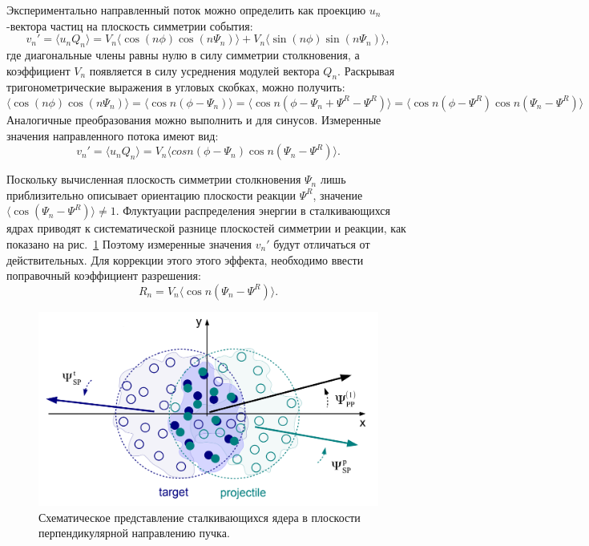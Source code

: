 Экспериментально направленный поток можно определить как проекцию $u_n$-вектора частиц на плоскость симметрии события:
%
\begin{equation}
    v_n' =  \langle u_n Q_n \rangle = 
    V_n \langle \cos (n\phi) \cos (n\Psi_n) \rangle + V_n \langle \sin(n\phi) \sin(n\Psi_n) \rangle,
\end{equation}
%
где диагональные члены равны нулю в силу симметрии столкновения, а коэффициент $V_n$ появляется в силу усреднения модулей вектора $Q_n$.
Раскрывая тригонометрические выражения в угловых скобках, можно получить:
%
\begin{equation}
    \langle \cos (n\phi) \cos (n\Psi_n) \rangle = \langle \cos n ( \phi - \Psi_n ) \rangle = 
    \langle \cos n ( \phi - \Psi_n + \Psi^R - \Psi^R ) \rangle =
    \langle \cos n ( \phi - \Psi^R ) \cos n (\Psi_n - \Psi^R ) \rangle
\end{equation}
%
Аналогичные преобразования можно выполнить и для синусов. 
Измеренные значения направленного потока имеют вид:
%
\begin{equation}
    v_n' =  \langle u_n Q_n \rangle = 
    V_n \langle cos n ( \phi - \Psi_n ) \cos n (\Psi_n - \Psi^R) \rangle.
    \label{eq:uq_transformation}
\end{equation}
%

Поскольку вычисленная плоскость симметрии столкновения $\Psi_n$ лишь приблизительно описывает ориентацию плоскости реакции $\Psi^R$, значение $ \langle \cos(\Psi_n - \Psi^R) \rangle \ne 1 $.
Флуктуации распределения энергии в сталкивающихся ядрах приводят к систематической разнице плоскостей симметрии и реакции, как показано на рис.~\ref{fig:pp_sp_rp}
Поэтому измеренные значения $v_n'$ будут отличаться от действительных.
Для коррекции этого этого эффекта, необходимо ввести поправочный коэффициент разрешения:
%
\begin{equation}
    R_n = V_n \langle \cos n (\Psi_n - \Psi^R) \rangle.
\end{equation}
%

%
\begin{figure}[ht]
\begin{center}
\includegraphics[width=0.75\linewidth]{images/v1_pp_sp.png}
\caption{Схематическое представление сталкивающихся ядера в плоскости перпендикулярной направлению пучка.}
\label{fig:pp_sp_rp}
\end{center}
\end{figure}
%

